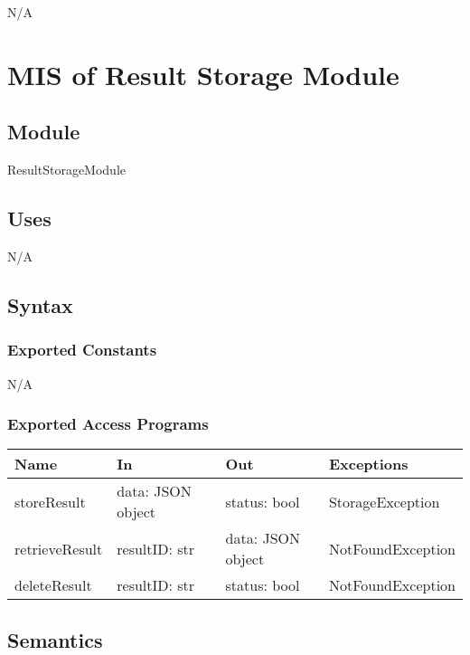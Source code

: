\documentclass[12pt, titlepage]{article}
\begin{document}
N/A
\section{MIS of Result Storage Module} \label{ResultStorageModule}

\subsection{Module}

ResultStorageModule

\subsection{Uses}

N/A

\subsection{Syntax}

\subsubsection{Exported Constants}

N/A

\subsubsection{Exported Access Programs}

\begin{center}
\begin{tabular}{p{3cm} p{4cm} p{4cm} p{5cm}}
\hline
\textbf{Name} & \textbf{In} & \textbf{Out} & \textbf{Exceptions} \\
\hline
storeResult & \raggedright\arraybackslash data: JSON object & \raggedright\arraybackslash status: bool & \raggedright\arraybackslash StorageException \\
\hline
retrieveResult & \raggedright\arraybackslash resultID: str & \raggedright\arraybackslash data: JSON object & \raggedright\arraybackslash NotFoundException \\
\hline
deleteResult & \raggedright\arraybackslash resultID: str & \raggedright\arraybackslash status: bool & \raggedright\arraybackslash NotFoundException \\
\hline
\end{tabular}
\end{center}

\subsection{Semantics}
\end{document}
